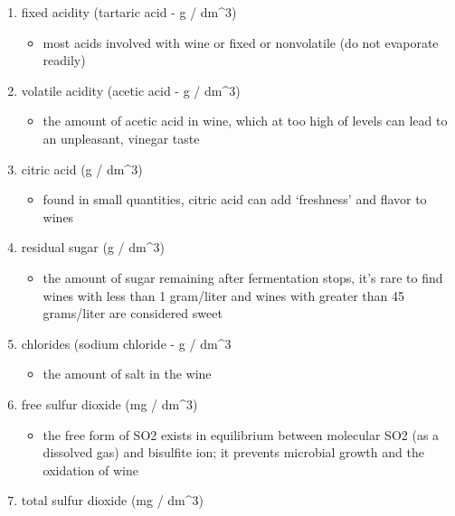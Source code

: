 \documentclass[]{article}
\providecommand{\tightlist}{%
  \setlength{\itemsep}{0pt}\setlength{\parskip}{0pt}}
\begin{document}
\begin{enumerate}
\def\labelenumi{\arabic{enumi}.}
\tightlist
\item
  fixed acidity (tartaric acid - g / dm\^{}3)

  \begin{itemize}
  \tightlist
  \item
    most acids involved with wine or fixed or nonvolatile (do not
    evaporate readily)
  \end{itemize}
\item
  volatile acidity (acetic acid - g / dm\^{}3)

  \begin{itemize}
  \tightlist
  \item
    the amount of acetic acid in wine, which at too high of levels can
    lead to an unpleasant, vinegar taste
  \end{itemize}
\item
  citric acid (g / dm\^{}3)

  \begin{itemize}
  \tightlist
  \item
    found in small quantities, citric acid can add `freshness' and
    flavor to wines
  \end{itemize}
\item
  residual sugar (g / dm\^{}3)

  \begin{itemize}
  \tightlist
  \item
    the amount of sugar remaining after fermentation stops, it's rare to
    find wines with less than 1 gram/liter and wines with greater than
    45 grams/liter are considered sweet
  \end{itemize}
\item
  chlorides (sodium chloride - g / dm\^{}3

  \begin{itemize}
  \tightlist
  \item
    the amount of salt in the wine
  \end{itemize}
\item
  free sulfur dioxide (mg / dm\^{}3)

  \begin{itemize}
  \tightlist
  \item
    the free form of SO2 exists in equilibrium between molecular SO2 (as
    a dissolved gas) and bisulfite ion; it prevents microbial growth and
    the oxidation of wine
  \end{itemize}
\item
  total sulfur dioxide (mg / dm\^{}3)


\end{enumerate}
\end{document}
